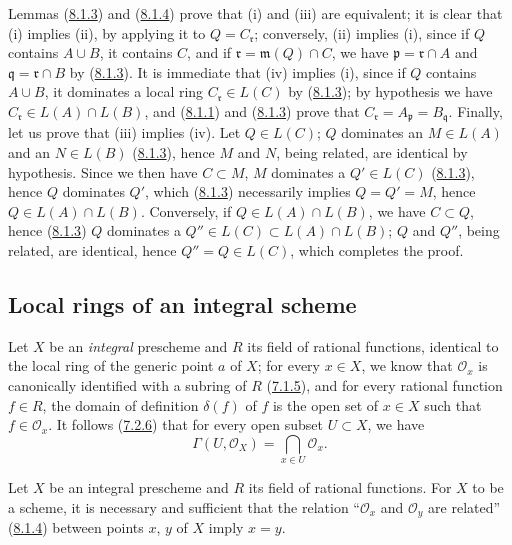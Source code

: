 Lemmas (\hyperref[I.8.1.3]{8.1.3}) and
(\hyperref[I.8.1.4]{8.1.4}) prove that (i) and (iii) are equivalent;
it is clear that (i) implies (ii), by applying it to $Q=C_\mathfrak r$;
conversely, (ii) implies (i), since if $Q$ contains $A\cup B$, it contains
$C$, and if $\mathfrak r=\mathfrak m(Q)\cap C$, we have
$\mathfrak p=\mathfrak r\cap A$ and $\mathfrak q=\mathfrak r\cap B$ by
(\hyperref[I.8.1.3]{8.1.3}). It is immediate that (iv) implies (i), since
if $Q$ contains $A\cup B$, it dominates a local ring
$C_\mathfrak r\in L(C)$ by (\hyperref[I.8.1.3]{8.1.3}); by hypothesis we
have $C_\mathfrak r\in L(A)\cap L(B)$, and
(\hyperref[I.8.1.1]{8.1.1}) and (\hyperref[I.8.1.3]{8.1.3}) prove that
$C_\mathfrak r=A_\mathfrak p=B_\mathfrak q$. Finally, let us prove that (iii)
implies (iv). Let $Q\in L(C)$; $Q$ dominates an $M\in L(A)$ and an
$N\in L(B)$ (\hyperref[I.8.1.3]{8.1.3}), hence $M$ and $N$, being
related, are identical by hypothesis. Since we then have $C\subset M$,
$M$ dominates a $Q'\in L(C)$ (\hyperref[I.8.1.3]{8.1.3}), hence $Q$
dominates $Q'$, which (\hyperref[I.8.1.3]{8.1.3}) necessarily implies
$Q=Q'=M$, hence $Q\in L(A)\cap L(B)$. Conversely, if
$Q\in L(A)\cap L(B)$, we have $C\subset Q$, hence
(\hyperref[I.8.1.3]{8.1.3}) $Q$ dominates a
$Q''\in L(C)\subset L(A)\cap L(B)$; $Q$ and $Q''$, being related, are
identical, hence $Q''=Q\in L(C)$, which completes the proof.

\subsection{Local rings of an integral scheme}
\label{subsection:I.8.2}

\begin{env}[8.2.1]
\label{I.8.2.1}
Let $X$ be an \emph{integral} prescheme and $R$ its field of rational
functions, identical to the local ring of the generic point $a$ of $X$; for
every $x\in X$, we know that $\mathscr{O}_x$ is canonically identified with a
subring of $R$ (\hyperref[I.7.1.5]{7.1.5}), and for every rational
function $f\in R$, the domain of definition $\delta(f)$ of $f$ is the open
set of $x\in X$ such that $f\in\mathscr{O}_x$. It follows
(\hyperref[I.7.2.6]{7.2.6}) that for every open subset $U\subset X$, we have
\begin{equation}
  \Gamma(U,\mathscr{O}_X)=\bigcap_{x\in U}\mathscr{O}_x.
  \tag{8.2.1.1}\label{I.8.2.1.1}
\end{equation}
\end{env}

\begin{proposition}[8.2.2]
\label{I.8.2.2}
Let $X$ be an integral prescheme and $R$ its field of rational functions.
For $X$ to be a scheme, it is necessary and sufficient that the relation
``$\mathscr{O}_x$ and $\mathscr{O}_y$ are related''
(\hyperref[I.8.1.4]{8.1.4}) between points $x$, $y$ of $X$ imply $x=y$.
\end{proposition}

